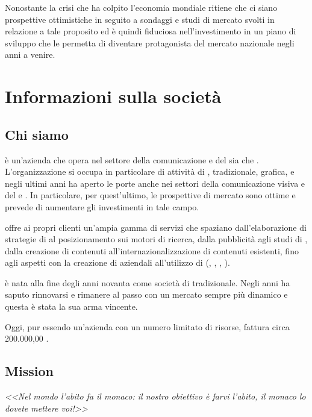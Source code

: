 Nonostante la crisi che ha colpito l'economia mondiale \customer ritiene che ci siano prospettive ottimistiche in seguito a sondaggi e studi di mercato svolti in relazione a tale proposito ed è quindi fiduciosa nell'investimento in un piano di sviluppo che le permetta di diventare protagonista del mercato nazionale negli anni a venire.



\chapter{Informazioni sulla società}\label{sec:whoweare}

\section{Chi siamo}
\customer è un'azienda che opera nel settore della comunicazione e del \mktg sia  che . 
L'organizzazione si occupa in particolare di attività di , \mktg tradizionale, grafica, e negli ultimi anni ha aperto le porte anche nei settori della comunicazione visiva e del \mktg {} e . In particolare, per quest'ultimo, le prospettive di mercato sono ottime e \customer prevede di aumentare gli investimenti in tale campo.

\customer offre ai propri clienti un'ampia gamma di servizi che spaziano dall'elaborazione di strategie di \mktg al posizionamento sui motori di ricerca, dalla pubblicità  agli studi di , dalla creazione di contenuti all'internazionalizzazione di contenuti esistenti, fino agli aspetti  con la creazione di  aziendali all'utilizzo di  (, , , ).

\customer è nata alla fine degli anni novanta come società di  tradizionale. Negli anni ha saputo rinnovarsi e rimanere al passo con un mercato sempre più dinamico e questa è stata la sua arma vincente.

Oggi, pur essendo un'azienda con un numero limitato di risorse, fattura circa  200.000,00 \text{\euro}.

\section{Mission}\markboth{}{}
\begin{Large}
\itshape
<<Nel mondo l'abito fa il monaco: il nostro obiettivo è farvi l'abito, il monaco lo dovete mettere voi!>>
\end{Large}

